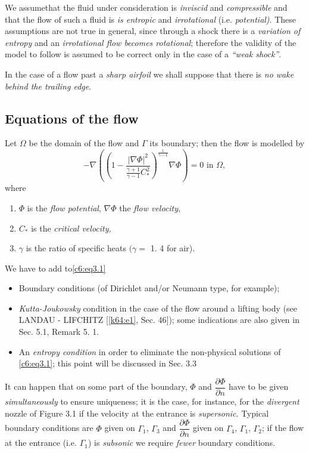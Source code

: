 We assume\pageoriginale that the fluid under consideration is
\textit{inviscid} and  
\textit{compressible} and that the flow of such a fluid is 
\textit{is entropic} and \textit{irrotational} (i.e. 
\textit{potential)}.  These assumptions are not true in general,  since 
through a shock there is a \textit{variation of entropy} and an 
\textit{irrotational flow becomes rotational}; therefore the validity 
of the model to follow is assumed to be correct only in the case of a 
\textit{``weak shock''}.        

In the case of a flow past a \textit{sharp airfoil} we shall suppose 
that there is \textit{no wake behind the trailing edge}.  

\subsection{Equations of the flow}\label{c6:ss3.2}%
Let $\Omega$ be the domain of the flow and $\Gamma$ its boundary; then 
the flow is modelled by  
\begin{equation}
-\nabla \left( \left( 1 - \frac{|\nabla \Phi 
|^2}{\frac{\gamma + 1}{\gamma - 1}C^2_*}\right)^{\frac{1}{\gamma - 
1}}\nabla \Phi \right) = 0 \text{ in }\Omega, \tag{3.1}\label{c6:eq3.1}  
\end{equation}
where 
\begin{enumerate}[-]
\item $\Phi$  is  the \textit{flow potential}, $\nabla \Phi$  
the \textit{flow velocity},  
\item $C_*$ is the \textit{critical velocity, }
\item $\gamma$ is the ratio of specific heats $( \gamma =$ 1. 4 for air).  
\end{enumerate}
We have to add to\eqref{c6:eq3.1} 
\begin{itemize}
\item Boundary conditions (of Dirichlet and/or Neumann type,  for example);
\item \textit{Kutta-Joukowsky} condition in the case of the flow
  around a lifting body (see LANDAU - LIFCHITZ [\ref{k64:e1},  Sec. 46]); some
  indications are also given in Sec. 5.1,  Remark 5. 1. 
\item An \textit{entropy condition} in order to eliminate the 
non-physical solutions of \eqref{c6:eq3.1}; this point will be 
discussed in Sec. 3.3   
\end{itemize}

\begin{remark}\label{c6:rem3.1} %
 It can happen that on some part of the boundary,  $\Phi $ and 
 $\dfrac{\partial \Phi}{\partial n}$  have to be given 
 \textit{simultaneously }  to ensure uniqueness; it is the case, for 
 instance, for the \textit{divergent} nozzle of Figure 3.1 if the 
 velocity  at the entrance is \textit{supersonic}. Typical boundary 
 conditions are $\Phi$ given on $\Gamma_1$, $\Gamma_3$ and 
 $\dfrac{\partial \Phi}{\partial n}$ given on $\Gamma_4$, $\Gamma_1$, 
 $\Gamma_2$; if the flow at the entrance (i.e.  $\Gamma_1$) is 
 \textit{subsonic} we require \textit{fewer} boundary conditions.       
 \end{remark}

